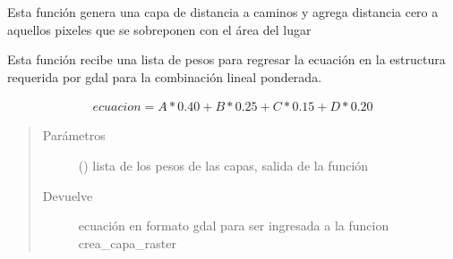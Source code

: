 \documentclass[letterpaper,10pt,spanish]{sphinxmanual}
\begin{document}
\begin{fulllineitems}
\label{\detokenize{apcsig:apcsig.distancia_caminos_lugar}}
Esta función genera una capa de distancia a caminos y agrega distancia cero a aquellos pixeles que se sobreponen con el área del lugar

\end{fulllineitems}


\begin{fulllineitems}
\label{\detokenize{apcsig:apcsig.ecuacion_clp}}
Esta función recibe una lista de pesos para regresar la ecuación
en la estructura requerida por gdal para la combinación lineal ponderada.

\begin{equation*}
\begin{split}ecuacion = A*0.40 + B*0.25 + C*0.15 +D*0.20\end{split}
\end{equation*}\begin{quote}\begin{description}
\item[{Parámetros}] \leavevmode
{} () \textendash{} lista de los pesos de las capas, salida de la función

\item[{Devuelve}] \leavevmode
ecuación en formato gdal para ser ingresada a la funcion crea\_capa\_raster

\end{description}\end{quote}

\end{fulllineitems}

\end{document}
